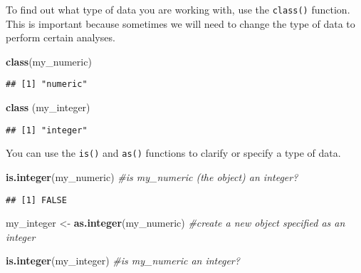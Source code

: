 \documentclass[
]{article}
\newenvironment{Shaded}{\begin{snugshade}}{\end{snugshade}}
\newcommand{\CommentTok}[1]{\textcolor[rgb]{0.56,0.35,0.01}{\textit{#1}}}
\newcommand{\FunctionTok}[1]{\textcolor[rgb]{0.13,0.29,0.53}{\textbf{#1}}}
\newcommand{\NormalTok}[1]{#1}
\newcommand{\OtherTok}[1]{\textcolor[rgb]{0.56,0.35,0.01}{#1}}
\begin{document}
To find out what type of data you are working with, use the
\texttt{class()} function. This is important because sometimes we will
need to change the type of data to perform certain analyses.

\begin{Shaded}
\begin{Highlighting}[]
\FunctionTok{class}\NormalTok{(my\_numeric)}
\end{Highlighting}
\end{Shaded}

\begin{verbatim}
## [1] "numeric"
\end{verbatim}

\begin{Shaded}
\begin{Highlighting}[]
\FunctionTok{class}\NormalTok{ (my\_integer)}
\end{Highlighting}
\end{Shaded}

\begin{verbatim}
## [1] "integer"
\end{verbatim}

You can use the \texttt{is()} and \texttt{as()} functions to clarify or
specify a type of data.

\begin{Shaded}
\begin{Highlighting}[]
\FunctionTok{is.integer}\NormalTok{(my\_numeric) }\CommentTok{\#is my\_numeric (the object) an integer?}
\end{Highlighting}
\end{Shaded}

\begin{verbatim}
## [1] FALSE
\end{verbatim}

\begin{Shaded}
\begin{Highlighting}[]
\NormalTok{my\_integer }\OtherTok{\textless{}{-}} 
  \FunctionTok{as.integer}\NormalTok{(my\_numeric) }\CommentTok{\#create a new object specified as an integer}
\end{Highlighting}
\end{Shaded}

\begin{Shaded}
\begin{Highlighting}[]
\FunctionTok{is.integer}\NormalTok{(my\_integer) }\CommentTok{\#is my\_numeric an integer?}
\end{Highlighting}
\end{Shaded}
\end{document}

